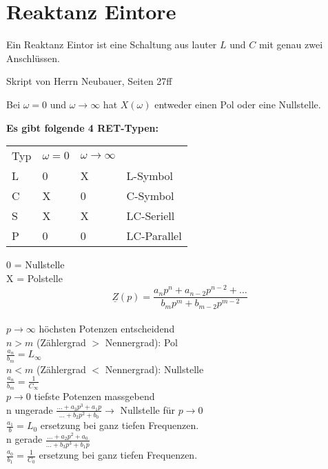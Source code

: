 \section{Reaktanz Eintore}
Ein Reaktanz Eintor ist eine Schaltung aus lauter $L$ und $C$ mit genau zwei
Anschlüssen.

Skript von Herrn Neubauer, Seiten 27ff

Bei $\omega = 0$ und $\omega \rightarrow \infty$ hat $X(\omega)$ entweder einen
Pol oder eine Nullstelle.

\textbf{Es gibt folgende 4 RET-Typen:}

\begin{tabular}{llll}
Typ & $\omega=0$ & $\omega \rightarrow \infty$&\\
L & 0 & X & L-Symbol\\
C & X & 0 & C-Symbol\\
S & X & X & LC-Seriell\\
P & 0 & 0 & LC-Parallel\\
\end{tabular}

0 = Nullstelle\\
X = Polstelle\\

$$\underline{Z}(p)=\frac{a_np^n+a_{n-2}p^{n-2}+\ldots}{b_mp^m+b_{m-2}p^{m-2}}$$\\
$p\rightarrow \infty$ höchsten Potenzen entscheidend\\
\hspace*{5pt}$n>m$ (Zählergrad $>$ Nennergrad): Pol\\
\hspace*{10pt}$\frac{a_n}{b_m}=L_{\infty}$\\
\hspace*{5pt}$n<m$ (Zählergrad $<$ Nennergrad): Nullstelle\\
\hspace*{10pt}$\frac{a_n}{b_m}=\frac{1}{C_{\infty}}$\\
$p\rightarrow 0$ tiefste Potenzen massgebend\\
\hspace*{5pt}n ungerade
$\frac{\ldots+a_3p^3+a_1p}{\ldots+b_2p^2+b_0}\rightarrow$ Nullstelle für $p\rightarrow 0$\\
\hspace*{10pt}$\frac{a_1}{b} = L_0$ ersetzung bei ganz tiefen Frequenzen.\\
\hspace*{5pt}n gerade $\frac{\ldots+a_2p^2+a_0}{\ldots+b_3p^3+b_1p}$\\
\hspace*{10pt}$\frac{a_0}{b_1}=\frac{1}{C_0}$ ersetzung bei ganz tiefen
Frequenzen.\\


